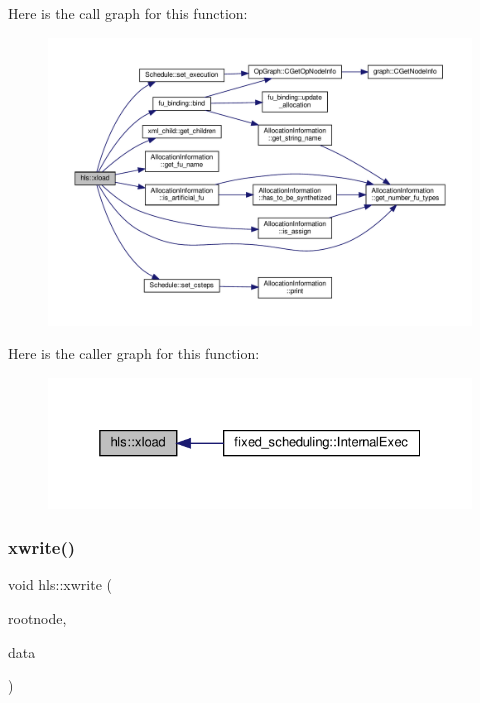 Here is the call graph for this function\+:
\nopagebreak
\begin{figure}[H]
\begin{center}
\leavevmode
\includegraphics[width=350pt]{d5/d18/classhls_a49ad456bf4fd4865d39a688b90ffbff6_cgraph}
\end{center}
\end{figure}
Here is the caller graph for this function\+:
\nopagebreak
\begin{figure}[H]
\begin{center}
\leavevmode
\includegraphics[width=325pt]{d5/d18/classhls_a49ad456bf4fd4865d39a688b90ffbff6_icgraph}
\end{center}
\end{figure}
\mbox{\label{classhls_a49a13fe020ba1c669604ed1140612378}} 
\subsubsection{\texorpdfstring{xwrite()}{xwrite()}}
{\footnotesize\ttfamily void hls\+::xwrite (\begin{DoxyParamCaption}\item[{\hyperlink{classxml__element}{xml\+\_\+element} $\ast$}]{rootnode,  }\item[{const \hyperlink{op__graph_8hpp_a9a0b240622c47584bee6951a6f5de746}{Op\+Graph\+Const\+Ref}}]{data }\end{DoxyParamCaption})}




